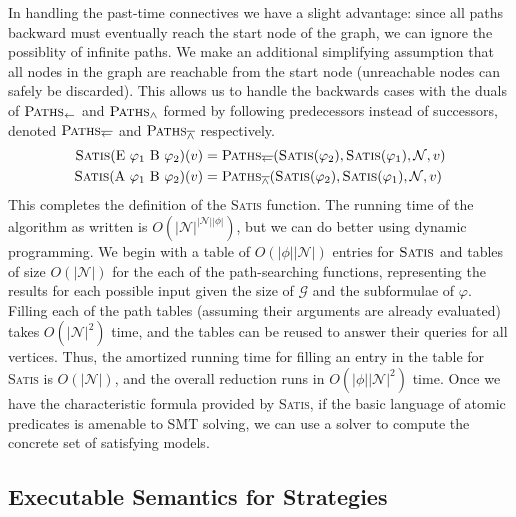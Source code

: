 \documentclass{eptcs}
\newcommand{\EB}[2]{\textrm{E}\ #1\ \textrm{B}\ #2}
\newcommand{\AB}[2]{\textrm{A}\ #1\ \textrm{B}\ #2}
\newcommand{\satis}[1]{\textsc{Satis}(#1)}
\newcommand{\PathsBackRaw}{\textsc{Paths}_{\leftarrow}}
\newcommand{\PathsBBackRaw}{\textsc{Paths}_{\overline{\leftarrow}}}
\newcommand{\PathsBBack}[4]{\PathsBBackRaw(#1,#2,#3,#4)}
\newcommand{\PathsAndRaw}{\textsc{Paths}_{\land}}
\newcommand{\PathsBAndRaw}{\textsc{Paths}_{\overline{\land}}}
\newcommand{\PathsBAnd}[4]{\PathsBAndRaw(#1,#2,#3,#4)}
\newcommand{\card}[1]{\ensuremath{\left|#1\right|}}
\begin{document}
In handling the past-time connectives we have a slight advantage: since all paths backward must eventually reach the start node of the graph, we can ignore the possiblity of infinite paths. We make an additional simplifying
assumption that all nodes in the graph are reachable from the start node (unreachable nodes can safely be discarded). This allows us to handle the
backwards cases with the duals of $\PathsBackRaw$ and $\PathsAndRaw$ formed by following
predecessors instead of successors, denoted $\PathsBBackRaw$ and $\PathsBAndRaw$
respectively.
\begin{align*}
\satis{\EB{\varphi_1}{\varphi_2}}(v)&=\PathsBBack{\satis{\varphi_2}}{\satis{\varphi_1}}{\mathcal{N}}{v}\\
\satis{\AB{\varphi_1}{\varphi_2}}(v)&=\PathsBAnd{\satis{\varphi_2}}{\satis{\varphi_1}}{\mathcal{N}}{v}
\end{align*}
This completes the definition of the \textsc{Satis} function. The running time of the algorithm as written is
$O\left(\card{\mathcal{N}}^{\card{\mathcal{N}}\card{\phi}}\right)$, but we can do better using dynamic programming. We
begin with a table of $O(\card{\phi}\card{\mathcal{N}})$ entries for $\textsc{Satis}$ and
tables of size $O(\card{\mathcal{N}})$ for the each of the path-searching functions, representing the results for each possible input given the size of $\mathcal{G}$ and the subformulae of $\varphi$. Filling each of the path tables
(assuming their arguments are already evaluated) takes $O(\card{\mathcal{N}}^2)$ time, and the tables can
be reused to answer their queries for all vertices. Thus, the amortized running time for filling an entry in the table for \textsc{Satis} is $O(\card{\mathcal{N}})$, and the overall reduction runs in $O(\card{\phi}\card{\mathcal{N}}^2)$ time.
 Once we have the characteristic formula provided by \textsc{Satis}, if the basic language of atomic predicates is amenable to SMT solving, we can use a solver to compute the concrete set of satisfying models.

\subsection{Executable Semantics for Strategies}
\label{exec}
\end{document}
